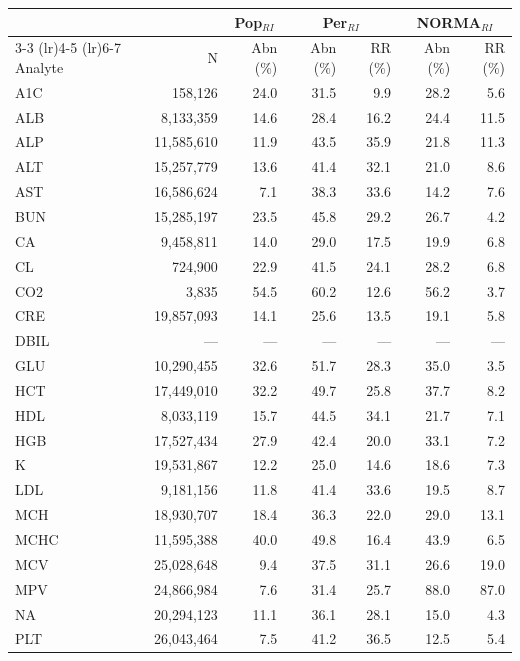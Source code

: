 \begin{table}[ht]
\centering
\footnotesize
\begin{tabular}{lrrrrrr}
\toprule
 & & \multicolumn{1}{c}{Pop$_{RI}$} & \multicolumn{2}{c}{Per$_{RI}$} & \multicolumn{2}{c}{NORMA$_{RI}$} \\
\cmidrule(lr){3-3} \cmidrule(lr){4-5} \cmidrule(lr){6-7}
Analyte & N & Abn (\%) & Abn (\%) & RR (\%) & Abn (\%) & RR (\%) \\
\midrule
A1C & 158,126 & 24.0 & 31.5 & 9.9 & 28.2 & 5.6 \\
ALB & 8,133,359 & 14.6 & 28.4 & 16.2 & 24.4 & 11.5 \\
ALP & 11,585,610 & 11.9 & 43.5 & 35.9 & 21.8 & 11.3 \\
ALT & 15,257,779 & 13.6 & 41.4 & 32.1 & 21.0 & 8.6 \\
AST & 16,586,624 & 7.1 & 38.3 & 33.6 & 14.2 & 7.6 \\
BUN & 15,285,197 & 23.5 & 45.8 & 29.2 & 26.7 & 4.2 \\
CA & 9,458,811 & 14.0 & 29.0 & 17.5 & 19.9 & 6.8 \\
CL & 724,900 & 22.9 & 41.5 & 24.1 & 28.2 & 6.8 \\
CO2 & 3,835 & 54.5 & 60.2 & 12.6 & 56.2 & 3.7 \\
CRE & 19,857,093 & 14.1 & 25.6 & 13.5 & 19.1 & 5.8 \\
DBIL & --- & --- & --- & --- & --- & --- \\
GLU & 10,290,455 & 32.6 & 51.7 & 28.3 & 35.0 & 3.5 \\
HCT & 17,449,010 & 32.2 & 49.7 & 25.8 & 37.7 & 8.2 \\
HDL & 8,033,119 & 15.7 & 44.5 & 34.1 & 21.7 & 7.1 \\
HGB & 17,527,434 & 27.9 & 42.4 & 20.0 & 33.1 & 7.2 \\
K & 19,531,867 & 12.2 & 25.0 & 14.6 & 18.6 & 7.3 \\
LDL & 9,181,156 & 11.8 & 41.4 & 33.6 & 19.5 & 8.7 \\
MCH & 18,930,707 & 18.4 & 36.3 & 22.0 & 29.0 & 13.1 \\
MCHC & 11,595,388 & 40.0 & 49.8 & 16.4 & 43.9 & 6.5 \\
MCV & 25,028,648 & 9.4 & 37.5 & 31.1 & 26.6 & 19.0 \\
MPV & 24,866,984 & 7.6 & 31.4 & 25.7 & 88.0 & 87.0 \\
NA & 20,294,123 & 11.1 & 36.1 & 28.1 & 15.0 & 4.3 \\
PLT & 26,043,464 & 7.5 & 41.2 & 36.5 & 12.5 & 5.4 \\

\end{tabular}
\end{table}
